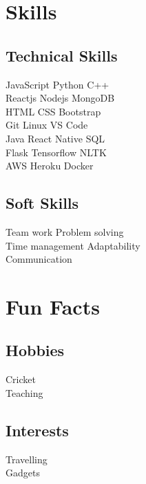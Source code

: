 \documentclass[]{deedy-resume-openfont}
\begin{document}
\begin{minipage}[t]{0.33\textwidth}

\section{Skills}

\subsection{Technical Skills}
JavaScript \textbullet{} Python \textbullet{} C++ \\
Reactjs \textbullet{} Nodejs \textbullet{} MongoDB \\  
HTML \textbullet{} CSS \textbullet{} Bootstrap \\
Git \textbullet{} Linux \textbullet{} VS Code  \\
Java \textbullet{} React Native \textbullet{} SQL \\
Flask \textbullet{} Tensorflow \textbullet{} NLTK \\
AWS \textbullet{} Heroku \textbullet{} Docker\\
 
\sectionsep

\subsection{Soft Skills}
Team work  \textbullet{} Problem solving \\
Time management  \textbullet{} Adaptability \\
Communication\\
\sectionsep


\section{Fun Facts } 
\subsection{Hobbies}
Cricket \\ Teaching \\
\sectionsep
\subsection{Interests}
Travelling \\ Gadgets \\
\sectionsep
\sectionsep

%
%

\end{minipage} 
\end{document}
